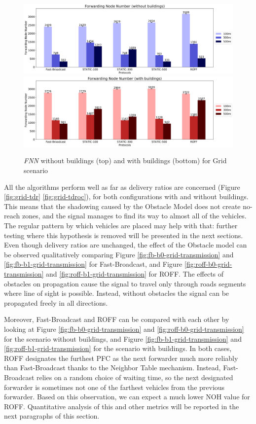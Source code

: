 		\begin{figure}[H]
			\centering
			\includegraphics[width=1.0\textwidth]{immagini/grid-300/b0/fnn}
			\includegraphics[width=1.0\textwidth]{immagini/grid-300/b1/fnn}
			\caption{\textit{FNN} without buildings (top) and with buildings (bottom) for Grid scenario}
			\label{fig:grid-fnn}
		\end{figure}
		
		\newpage
		
		All the algorithms perform well as far as delivery ratios are concerned (Figure \ref{fig:grid-tdr} \ref{fig:grid-tdroc}), for both configurations with and without buildings. This means that the shadowing caused by the Obstacle Model does not create no-reach zones, and the signal manages to find its way to almost all of the vehicles. The regular pattern by which vehicles are placed may help with that: further testing where this hypothesis is removed will be presented in the next sections. Even though delivery ratios are unchanged, the effect of the Obstacle model can be observed qualitatively comparing Figure \ref{fig:fb-b0-grid-transmission} and \ref{fig:fb-b1-grid-transmission} for Fast-Broadcast, and Figure \ref{fig:roff-b0-grid-transmission} and \ref{fig:roff-b1-grid-transmission} for ROFF. The effects of obstacles on propagation cause the signal to travel only through roads segments where line of sight is possible. Instead, without obstacles the signal can be propagated freely in all directions.
		
		
		Moreover, Fast-Broadcast and ROFF can be compared with each other by looking at Figure \ref{fig:fb-b0-grid-transmission} and \ref{fig:roff-b0-grid-transmission} for the scenario without buildings, and Figure \ref{fig:fb-b1-grid-transmission} and \ref{fig:roff-b1-grid-transmission} for the scenario with buildings. In both cases, ROFF designates the furthest PFC as the next forwarder much more reliably than Fast-Broadcast thanks to the Neighbor Table mechanism. Instead, Fast-Broadcast relies on a random choice of waiting time, so the next designated forwarder is sometimes not one of the farthest vehicles from the previous forwarder. Based on this observation, we can expect a much lower NOH value for ROFF. Quantitative analysis of this and other metrics will be reported in the next paragraphs of this section.
		
